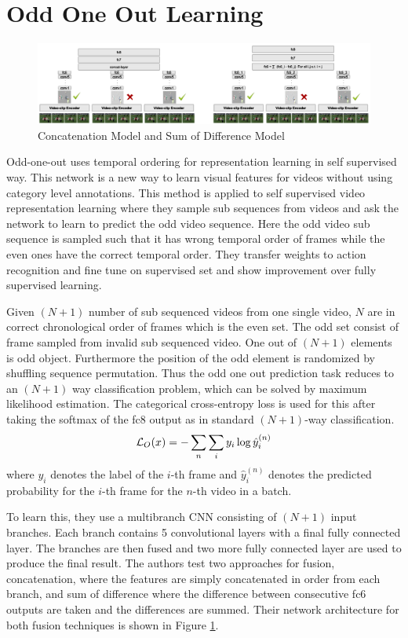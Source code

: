 \section{Odd One Out Learning}

\begin{figure}
    \centering
    \includegraphics[width=\textwidth]{images/o3n1.png}
    \caption{Concatenation Model and Sum of Difference Model}
    \label{fig:fusionmodel}
\end{figure}

Odd-one-out uses temporal ordering for representation learning in self supervised way.
This network is a new way to learn visual features for videos without using category level annotations. This method is applied to self supervised video representation learning where they sample sub sequences from videos and ask the network to learn to predict the odd video sequence. Here the odd video sub sequence is sampled such that it has wrong temporal order of frames while the even ones have the correct temporal order. 
They transfer weights to action recognition and fine tune on supervised set and show improvement over fully supervised learning.

Given $(N+1)$ number of sub sequenced videos from one single video, $N$ are in correct chronological order of frames which is the even set. The odd set consist of frame sampled from invalid sub sequenced video. One out of $(N+1)$ elements is odd object. Furthermore the position of the odd element is randomized by shuffling sequence permutation. Thus the odd one out prediction task reduces to an $(N+1)$ way classification problem, which can be solved by maximum likelihood estimation. The categorical cross-entropy loss is used for this after taking the softmax of the fc8 output as in standard $(N+1)$-way classification.
\begin{equation}
\mathcal{L}_O(x) = -\sum_n \sum_i y_i \log \hat{y}_i^{(n)}
\end{equation}
where $y_i$ denotes the label of the $i$-th frame and $\hat{y}_i^{(n)}$ denotes the predicted probability for the $i$-th frame for the $n$-th video in a batch.

To learn this, they use a  multibranch CNN consisting of $(N+1)$ input branches. Each branch contains 5 convolutional layers with a final fully connected layer. The branches are then fused and two more fully connected layer are used to produce the final result. The authors test two approaches for fusion,  concatenation, where the features are simply concatenated in order from each branch, and sum of difference where the difference between consecutive fc6 outputs are taken and the differences are summed. Their network architecture for both fusion techniques is shown in Figure \ref{fig:fusionmodel}.

